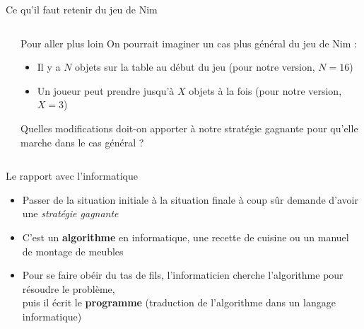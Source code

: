 \begin{frame}{Ce qu'il faut retenir du jeu de Nim}
\begin{columns}
\begin{column}{0.7\linewidth}
    \end{column}
    \begin{column}{0.3\linewidth}

      \begin{block}{Pour aller plus loin}
        On pourrait imaginer un cas plus général du jeu de Nim :

        \begin{itemize}
          \item Il y a $N$ objets sur la table au début du jeu (pour notre version, $N=16$)
          \item Un joueur peut prendre jusqu'à $X$ objets à la fois (pour notre version, $X=3$)
        \end{itemize}

        Quelles modifications doit-on apporter à notre stratégie gagnante pour qu'elle marche dans le cas général ?
      \end{block}

    \end{column}
  \end{columns}

  \begin{block}{Le rapport avec l'informatique}
    \begin{itemize}
    \item Passer de la situation initiale à la situation finale à coup sûr demande d'avoir
      une \textit{stratégie gagnante}
    \item C'est un \alert{\textbf{algorithme}} en informatique, une recette de
      cuisine ou un manuel de montage de meubles
    \item Pour se faire obéir du tas de fils, l'informaticien cherche
      l'algorithme pour résoudre le problème,\\
      puis il écrit le \alert{\textbf{programme}} (traduction de l'algorithme
      dans un langage informatique)
    \end{itemize}
  \end{block}

\end{frame}
